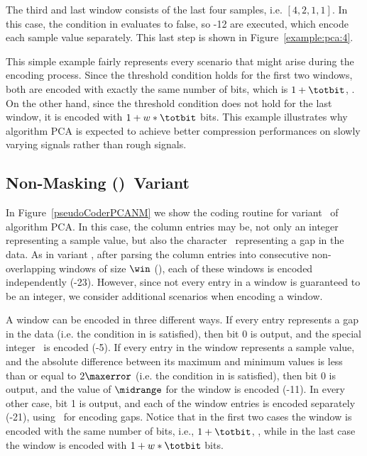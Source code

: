 \vspace{-10pt}
The third and last window consists of the last four samples, i.e. $[4, 2, 1, 1]$. In this case, the condition in  evaluates to false, so -12 are executed, which encode each sample value separately. This last step is shown in Figure~\ref{example:pca:4}.




\vspace{-10pt}
This simple example fairly represents every scenario that might arise during the encoding process. Since the threshold condition holds for the first two windows, both are encoded with exactly the same number of bits, which is $1 + \totbit$, \wheretotbit. On the other hand, since the threshold condition does not hold for the last window, it is encoded with $1 + w*\totbit$ bits. This example illustrates why algorithm PCA is expected to achieve better compression performances on slowly varying signals rather than rough signals.




\subsection{Non-Masking (\NOmaskalgo)\ Variant}
\label{algo:pca:nmvariant}


In Figure~\ref{pseudoCoderPCANM} we show the coding routine for variant \NOmaskalgo\ of algorithm PCA. In this case, the column entries may be, not only an integer representing a sample value, but also the character \noData\ representing a gap in the data. As in variant \maskalgo, after parsing the column entries into consecutive non-overlapping windows of size $\win$ (), each of these windows is encoded independently (-23). However, since not every entry in a window is guaranteed to be an integer, we consider additional scenarios when encoding a window.





A window can be encoded in three different ways. If every entry represents a gap in the data (i.e. the condition in  is satisfied), then bit 0 is output, and the special integer \nodata\ is encoded (-5). If every entry in the window represents a sample value, and the absolute difference between its maximum and minimum values is less than or equal to $2\maxerror$ (i.e. the condition in  is satisfied), then bit 0 is output, and the value of $\midrange$ for the window is encoded (-11). In every other case, bit 1 is output, and each of the window entries is encoded separately (-21), using \nodata\ for encoding gaps. Notice that in the first two cases the window is encoded with the same number of bits, i.e., $1 + \totbit$, \wheretotbit, while in the last case the window is encoded with $1 + w*\totbit$ bits.


